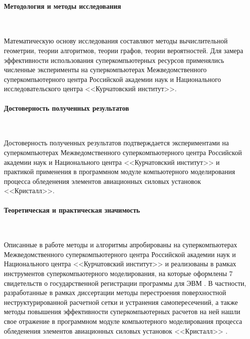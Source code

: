 



\paragraph{Методология и методы исследования} \

Математическую основу исследования составляют методы вычислительной геометрии, теории алгоритмов, теории графов, теории вероятностей.
Для замера эффективности использования суперкомпьютерных ресурсов применялись численные эксперименты на суперкомпьютерах Межведомственного суперкомпьютерного центра Российской академии наук и Национального исследовательского центра <<Курчатовский институт>>.



\paragraph{Достоверность полученных результатов} \

Достоверность полученных результатов подтверждается экспериментами на суперкомпьютерах Межведомственного суперкомпьютерного центра Российской академии наук и Национального центра <<Курчатовский институт>> и практикой применения в программном модуле компьютерного моделирования процесса обледенения элементов авиационных силовых установок <<Кристалл>>.

\paragraph{Теоретическая и практическая значимость} \



Описанные в работе методы и алгоритмы апробированы на суперкомпьютерах Межведомственного суперкомпьютерного центра Российской академии наук и Национального центра <<Курчатовский институт>> и реализованы в рамках инструментов суперкомпьютерного моделирования, на которые оформлены 7 свидетельств о государственной регистрации программы для ЭВМ \cite{CertGoryachev2023Crys,CertGoryachev2020Crys,CertRybakov2021PrepUnstruct,CertRybakov2020PrepStruct,CertRybakov2024Surf,CertRybakov2023Mon,CertRybakov2019AVX}.
В частности, разработанные в рамках диссертации методы перестроения поверхностной неструктурированной расчетной сетки и устранения самопересечений, а также методы повышения эффективности суперкомпьютерных расчетов на ней нашли свое отражение в программном модуле компьютерного моделирования процесса обледенения элементов авиационных силовых установок <<Кристалл>> \cite{CertGoryachev2023Crys,CertGoryachev2020Crys}.














